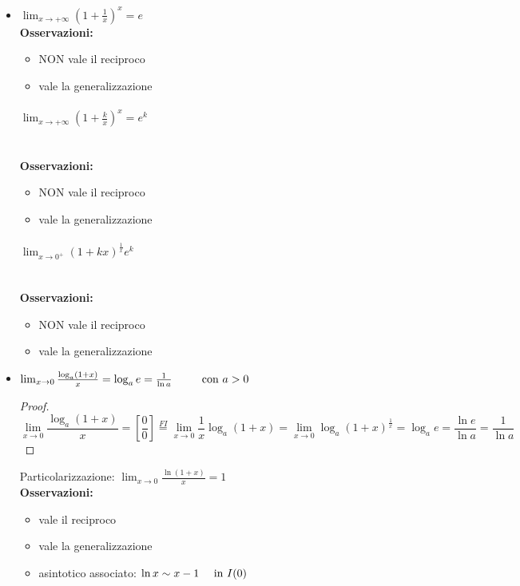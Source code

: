 \begin{itemize}
\item {$\lim_{x\to +\infty}\left(1+\frac{1}{x}\right)^{x} = e$}~\vspace{10pt}\\
\textbf{Osservazioni:}
\begin{itemize}
    \item NON vale il reciproco
    \item vale la generalizzazione
\end{itemize}

\paragraph{$\lim_{x\to +\infty}\left(1+\frac{k}{x}\right)^{x} = e^k$}~\vspace{10pt}\\
\textbf{Osservazioni:}
\begin{itemize}
    \item NON vale il reciproco
    \item vale la generalizzazione
\end{itemize}

\paragraph{$\lim_{x\to 0^+}\left(1+kx\right)^{\frac{1}{x}}  e^k$}~\vspace{10pt}\\
\textbf{Osservazioni:}
\begin{itemize}
    \item NON vale il reciproco
    \item vale la generalizzazione
\end{itemize}

\item {$\lim_{x\to 0}\frac{\log_a(1+x)}{x}=\log_ae=\frac{1}{\ln a}~~~~~~~~\textnormal{con }a>0$}
\begin{proof}
\[\lim_{x\to 0}\frac{\log_a(1+x)}{x}=\left[\frac{0}{0}\right]\overset{FI}{=}\lim_{x\to 0}\frac{1}{x}\log_a(1+x)=\lim_{x\to 0}\log_a(1+x)^\frac{1}{x}=\log_ae=\frac{\ln e}{\ln a}=\frac{1}{\ln a}\]
\end{proof}
Particolarizzazione: $\lim_{x\to0}\frac{\ln(1+x)}{x}=1$~\vspace{10pt}\\
\textbf{Osservazioni:}
\begin{itemize}
    \item vale il reciproco
    \item vale la generalizzazione
    \item asintotico associato: $\ln x \sim x - 1 ~~~~\textnormal{in } I(0)$
\end{itemize}


\end{itemize}
